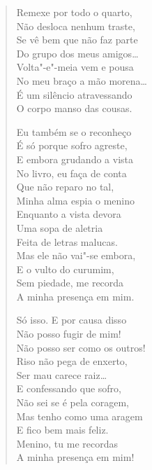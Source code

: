 \begin{verse}
Remexe por todo o quarto,\\
Não desloca nenhum traste,\\
Se vê bem que não faz parte\\
Do grupo dos meus amigos\ldots{}\\
Volta"-e"-meia vem e pousa\\
No meu braço a mão morena\ldots{}\\
É um silêncio atravessando\\
O corpo manso das cousas.

Eu também se o reconheço\\
É só porque sofro agreste,\\
E embora grudando a vista\\
No livro, eu faça de conta\\
Que não reparo no tal,\\
Minha alma espia o menino\\
Enquanto a vista devora\\
Uma sopa de aletria\\
Feita de letras malucas.\\
Mas ele não vai"-se embora,\\
E o vulto do curumim,\\
Sem piedade, me recorda\\
A minha presença em mim.

Só isso. E por causa disso\\
Não posso fugir de mim!\\
Não posso ser como os outros!\\
Riso não pega de enxerto,\\
Ser mau carece raiz\ldots{}\\
E confessando que sofro,\\
Não sei se é pela coragem,\\
Mas tenho como uma aragem\\
E fico bem mais feliz.\\
Menino, tu me recordas\\
A minha presença em mim!


\end{verse}
